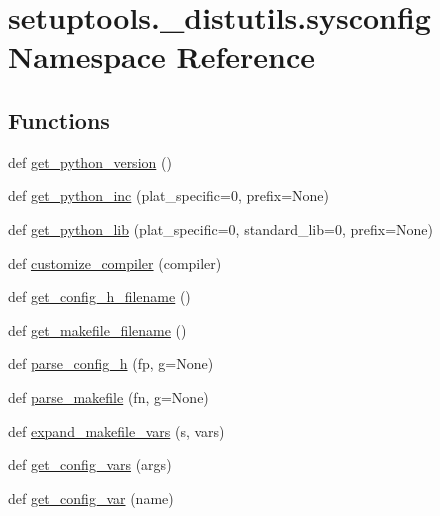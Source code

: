 \hypertarget{namespacesetuptools_1_1__distutils_1_1sysconfig}{}\section{setuptools.\+\_\+distutils.\+sysconfig Namespace Reference}
\label{namespacesetuptools_1_1__distutils_1_1sysconfig}
\subsection*{Functions}
\begin{DoxyCompactItemize}
\item 
def \hyperlink{namespacesetuptools_1_1__distutils_1_1sysconfig_a89f553c60c49aa98ccb15aeedb84c43b}{get\+\_\+python\+\_\+version} ()
\item 
def \hyperlink{namespacesetuptools_1_1__distutils_1_1sysconfig_a3c7b105160c06122eca6182428eecb3b}{get\+\_\+python\+\_\+inc} (plat\+\_\+specific=0, prefix=None)
\item 
def \hyperlink{namespacesetuptools_1_1__distutils_1_1sysconfig_a1ec7e0c564e204dd18365fb4a5dfb46d}{get\+\_\+python\+\_\+lib} (plat\+\_\+specific=0, standard\+\_\+lib=0, prefix=None)
\item 
def \hyperlink{namespacesetuptools_1_1__distutils_1_1sysconfig_a39184aa4767e425939a4b038b24eb974}{customize\+\_\+compiler} (compiler)
\item 
def \hyperlink{namespacesetuptools_1_1__distutils_1_1sysconfig_ae6fb6b585fe013858034390dbca0fb37}{get\+\_\+config\+\_\+h\+\_\+filename} ()
\item 
def \hyperlink{namespacesetuptools_1_1__distutils_1_1sysconfig_a54f9461ef3ea72829409f22730b1b57c}{get\+\_\+makefile\+\_\+filename} ()
\item 
def \hyperlink{namespacesetuptools_1_1__distutils_1_1sysconfig_a2eca1576cacb3c3143a36f4a777c2c6f}{parse\+\_\+config\+\_\+h} (fp, g=None)
\item 
def \hyperlink{namespacesetuptools_1_1__distutils_1_1sysconfig_a0107d6148fc958a5fb7dfe195899f08a}{parse\+\_\+makefile} (fn, g=None)
\item 
def \hyperlink{namespacesetuptools_1_1__distutils_1_1sysconfig_a90d216e1605d30720ae20edec827b572}{expand\+\_\+makefile\+\_\+vars} (s, vars)
\item 
def \hyperlink{namespacesetuptools_1_1__distutils_1_1sysconfig_a25304bca2db6df2257bfff276682f515}{get\+\_\+config\+\_\+vars} (args)
\item 
def \hyperlink{namespacesetuptools_1_1__distutils_1_1sysconfig_af15382b8afd67ab2f138f8d446d0fa4e}{get\+\_\+config\+\_\+var} (name)
\end{DoxyCompactItemize}
